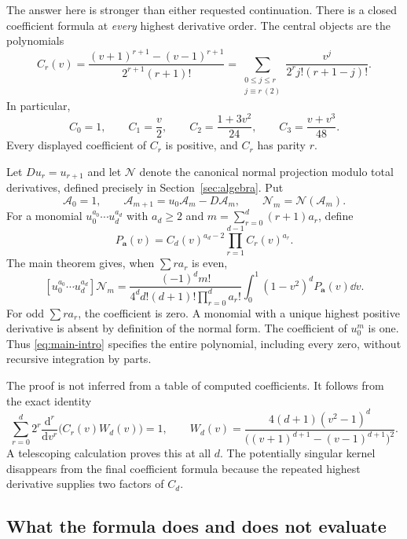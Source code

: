 \documentclass[11pt,letterpaper]{article}
\numberwithin{equation}{section}
\theoremstyle{plain}
\theoremstyle{definition}
\theoremstyle{remark}
\newcommand{\Ac}{\mathcal A}\newcommand{\Nc}{\mathcal N}\newcommand{\Hc}{\mathcal H}
\begin{document}
The answer here is stronger than either requested continuation. There is a closed coefficient formula at \emph{every} highest derivative order. The central objects are the polynomials
\begin{equation}\label{eq:Cr}
 C_r(v)=\frac{(v+1)^{r+1}-(v-1)^{r+1}}{2^{r+1}(r+1)!}
       =\sum_{\substack{0\le j\le r\\j\equiv r\ (2)}}
          \frac{v^j}{2^rj!(r+1-j)!}.
\end{equation}
In particular,
\[
 C_0=1,\qquad C_1=\frac v2,\qquad
 C_2=\frac{1+3v^2}{24},\qquad C_3=\frac{v+v^3}{48}.
\]
Every displayed coefficient of $C_r$ is positive, and $C_r$ has parity $r$.

Let $D u_r=u_{r+1}$ and let $\Nc$ denote the canonical normal projection modulo total derivatives, defined precisely in Section~\ref{sec:algebra}. Put
\begin{equation}\label{eq:hierarchy-intro}
 \Ac_0=1,\qquad \Ac_{m+1}=u_0\Ac_m-D\Ac_m,
 \qquad \Nc_m=\Nc(\Ac_m).
\end{equation}
For a monomial $u_0^{a_0}\cdots u_d^{a_d}$ with $a_d\ge2$ and
$m=\sum_{r=0}^d(r+1)a_r$, define
\[
 P_{\boldsymbol a}(v)=C_d(v)^{a_d-2}
                    \prod_{r=1}^{d-1}C_r(v)^{a_r}.
\]
The main theorem gives, when $\sum r a_r$ is even,
\begin{equation}\label{eq:main-intro}
 \boxed{\displaystyle
 [u_0^{a_0}\cdots u_d^{a_d}]\Nc_m
 =\frac{(-1)^d m!}{4^d d!(d+1)!\prod_{r=0}^d a_r!}
       \int_0^1(1-v^2)^dP_{\boldsymbol a}(v)\dd v.}
\end{equation}
For odd $\sum r a_r$, the coefficient is zero. A monomial with a unique highest positive derivative is absent by definition of the normal form. The coefficient of $u_0^m$ is one. Thus \eqref{eq:main-intro} specifies the entire polynomial, including every zero, without recursive integration by parts.

The proof is not inferred from a table of computed coefficients. It follows from the exact identity
\begin{equation}\label{eq:adjoint-intro}
 \sum_{r=0}^d2^r\frac{\mathrm d^r}{\mathrm dv^r}
       \bigl(C_r(v)W_d(v)\bigr)=1,
 \qquad
 W_d(v)=\frac{4(d+1)(v^2-1)^d}
 {\bigl((v+1)^{d+1}-(v-1)^{d+1}\bigr)^2}.
\end{equation}
A telescoping calculation proves this at all $d$. The potentially singular kernel disappears from the final coefficient formula because the repeated highest derivative supplies two factors of $C_d$.

\subsection{What the formula does and does not evaluate}
\end{document}
